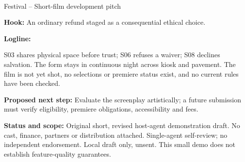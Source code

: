 \documentclass[11pt,letterpaper]{article}
\begin{document}
\begin{center}
{\Large\bfseries\sffamily \filmtitleupper}\\[6pt]
Festival -- Short-film development pitch
\end{center}
\textbf{Hook:} An ordinary refund staged as a consequential ethical choice.

\textbf{Logline:} \filmlogline

S03 shares physical space before trust; S06 refuses a waiver; S08 declines salvation. The form stays in continuous night across kiosk and pavement. The film is not yet shot, no selections or premiere status exist, and no current rules have been checked.

\textbf{Proposed next step:} Evaluate the screenplay artistically; a future submission must verify eligibility, premiere obligations, accessibility and fees.

\textbf{Status and scope:} Original short, revised host-agent demonstration draft. No cast, finance, partners or distribution attached. Single-agent self-review; no independent endorsement. Local draft only, unsent. This small demo does not establish feature-quality guarantees.
\end{document}
